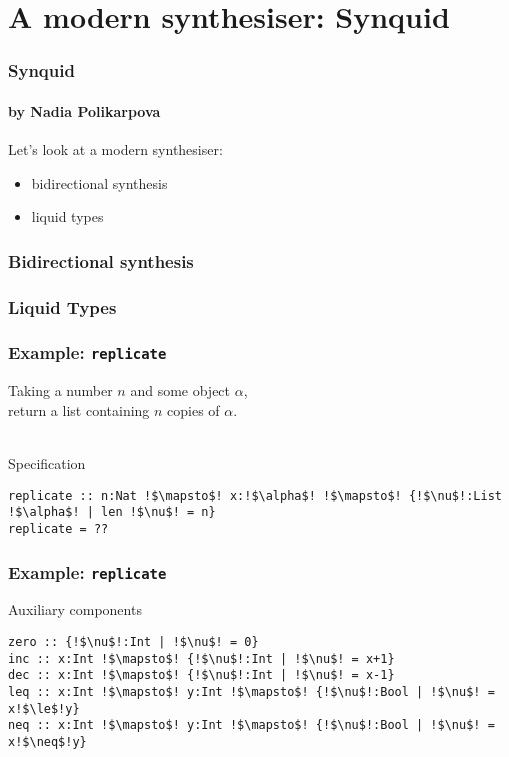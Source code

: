 \documentclass{beamer}
\theoremstyle{definition} %
\begin{document}
\section{A modern synthesiser: Synquid}

\begin{frame}
	\frametitle{\textbf{Synquid}}
	\framesubtitle{by Nadia Polikarpova}

	Let's look at a modern synthesiser:
	\begin{itemize}
		\item bidirectional synthesis
		\item liquid types
	\end{itemize}

\end{frame}

\begin{frame}
	\frametitle{Bidirectional synthesis}

\end{frame}

\begin{frame}
	\frametitle{Liquid Types}

\end{frame}

\begin{frame}[fragile]
	\frametitle{Example: \texttt{replicate}}

	Taking a number $n$ and some object $\alpha$,\\
	return a list containing $n$ copies of $\alpha$.\\~\\

	\begin{exampleblock}{Specification}
		\vspace*{-.2\baselineskip}
		\begin{lstlisting}[xleftmargin=1em, escapechar=!,style=imp]
replicate :: n:Nat !$\mapsto$! x:!$\alpha$! !$\mapsto$! {!$\nu$!:List !$\alpha$! | len !$\nu$! = n}
replicate = ??
		\end{lstlisting}
	\end{exampleblock}

\end{frame}

\begin{frame}[fragile]
	\frametitle{Example: \texttt{replicate}}

	\begin{exampleblock}{Auxiliary components}
		\vspace*{-.2\baselineskip}
		\begin{lstlisting}[xleftmargin=1em, escapechar=!,style=imp]
zero :: {!$\nu$!:Int | !$\nu$! = 0}
inc :: x:Int !$\mapsto$! {!$\nu$!:Int | !$\nu$! = x+1}
dec :: x:Int !$\mapsto$! {!$\nu$!:Int | !$\nu$! = x-1}
leq :: x:Int !$\mapsto$! y:Int !$\mapsto$! {!$\nu$!:Bool | !$\nu$! = x!$\le$!y}
neq :: x:Int !$\mapsto$! y:Int !$\mapsto$! {!$\nu$!:Bool | !$\nu$! = x!$\neq$!y}
		\end{lstlisting}
	\end{exampleblock}

\end{frame}
\end{document}
